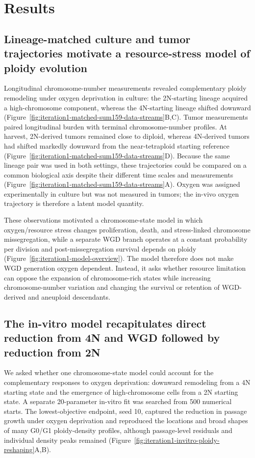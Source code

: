 \documentclass[11pt]{article}
\begin{document}
\section*{Results}

\subsection*{Lineage-matched culture and tumor trajectories motivate a resource-stress model of ploidy evolution}

Longitudinal chromosome-number measurements revealed complementary ploidy remodeling under oxygen deprivation in culture: the 2N-starting lineage acquired a high-chromosome component, whereas the 4N-starting lineage shifted downward (Figure~\ref{fig:iteration1-matched-sum159-data-streams}B,C). Tumor measurements paired longitudinal burden with terminal chromosome-number profiles. At harvest, 2N-derived tumors remained close to diploid, whereas 4N-derived tumors had shifted markedly downward from the near-tetraploid starting reference (Figure~\ref{fig:iteration1-matched-sum159-data-streams}D). Because the same lineage pair was used in both settings, these trajectories could be compared on a common biological axis despite their different time scales and measurements (Figure~\ref{fig:iteration1-matched-sum159-data-streams}A). Oxygen was assigned experimentally in culture but was not measured in tumors; the in-vivo oxygen trajectory is therefore a latent model quantity.

These observations motivated a chromosome-state model in which oxygen/resource stress changes proliferation, death, and stress-linked chromosome missegregation, while a separate WGD branch operates at a constant probability per division and post-missegregation survival depends on ploidy (Figure~\ref{fig:iteration1-model-overview}). The model therefore does not make WGD generation oxygen dependent. Instead, it asks whether resource limitation can oppose the expansion of chromosome-rich states while increasing chromosome-number variation and changing the survival or retention of WGD-derived and aneuploid descendants.

\subsection*{The in-vitro model recapitulates direct reduction from 4N and WGD followed by reduction from 2N}

We asked whether one chromosome-state model could account for the complementary responses to oxygen deprivation: downward remodeling from a 4N starting state and the emergence of high-chromosome cells from a 2N starting state. A separate 20-parameter in-vitro fit was searched from 500 numerical starts. The lowest-objective endpoint, seed 10, captured the reduction in passage growth under oxygen deprivation and reproduced the locations and broad shapes of many G0/G1 ploidy-density profiles, although passage-level residuals and individual density peaks remained (Figure~\ref{fig:iteration1-invitro-ploidy-reshaping}A,B).
\end{document}
